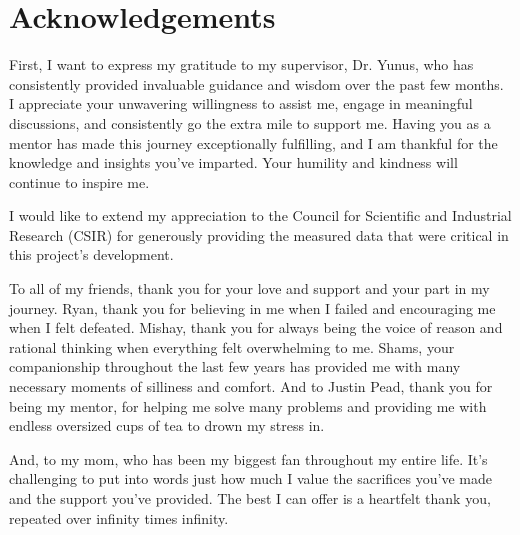 \documentclass[class=report,11pt,crop=false]{standalone}
\begin{document}
\chapter*{Acknowledgements}
First, I want to express my gratitude to my supervisor, Dr. Yunus, who has consistently provided invaluable guidance and wisdom over the past few months. I appreciate your unwavering willingness to assist me, engage in meaningful discussions, and consistently go the extra mile to support me. Having you as a mentor has made this journey exceptionally fulfilling, and I am thankful for the knowledge and insights you've imparted. Your humility and kindness will continue to inspire me.

I would like to extend my appreciation to the Council for Scientific and Industrial Research (CSIR) for generously providing the measured data that were critical in this project's development.

To all of my friends, thank you for your love and support and your part in my journey. Ryan, thank you for believing in me when I failed and encouraging me when I felt defeated. Mishay, thank you for always being the voice of reason and rational thinking when everything felt overwhelming to me. Shams, your companionship throughout the last few years has provided me with many necessary moments of silliness and comfort. And to Justin Pead, thank you for being my mentor, for helping me solve many problems and providing me with endless oversized cups of tea to drown my stress in.

And, to my mom, who has been my biggest fan throughout my entire life. It's challenging to put into words just how much I value the sacrifices you've made and the support you've provided. The best I can offer is a heartfelt thank you, repeated over infinity times infinity.
\end{document}
